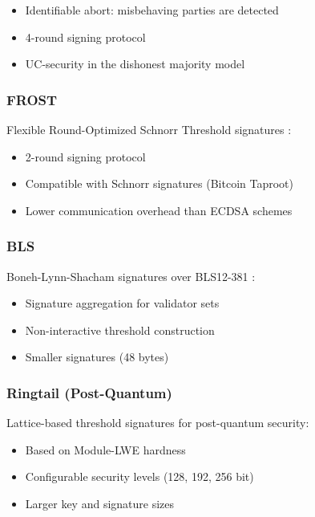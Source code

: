 \documentclass[11pt,twocolumn]{article}
\begin{document}
\begin{itemize}
\item Identifiable abort: misbehaving parties are detected
\item 4-round signing protocol
\item UC-security in the dishonest majority model
\end{itemize}

\subsubsection{FROST}

Flexible Round-Optimized Schnorr Threshold signatures \cite{frost}:

\begin{itemize}
\item 2-round signing protocol
\item Compatible with Schnorr signatures (Bitcoin Taproot)
\item Lower communication overhead than ECDSA schemes
\end{itemize}

\subsubsection{BLS}

Boneh-Lynn-Shacham signatures over BLS12-381 \cite{bls}:

\begin{itemize}
\item Signature aggregation for validator sets
\item Non-interactive threshold construction
\item Smaller signatures (48 bytes)
\end{itemize}

\subsubsection{Ringtail (Post-Quantum)}

Lattice-based threshold signatures for post-quantum security:

\begin{itemize}
\item Based on Module-LWE hardness
\item Configurable security levels (128, 192, 256 bit)
\item Larger key and signature sizes
\end{itemize}
\end{document}
